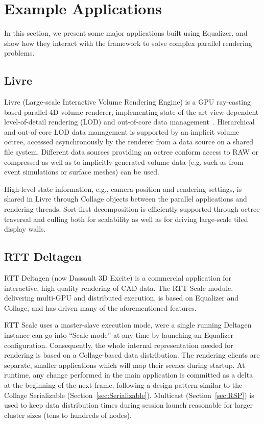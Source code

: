 \documentclass[10pt,journal,compsoc]{IEEEtran}
\newcommand{\sref}[1]{Section~\ref{#1}}
\begin{document}
\section{Example Applications} \label{sApplications}

In this section, we present some major applications built using
\textsf{Equalizer}, and
show how they interact with the framework to solve complex parallel rendering
problems.

\subsection{Livre}

Livre (Large-scale Interactive Volume Rendering Engine) is a GPU ray-casting based parallel
4D volume renderer, implementing state-of-the-art view-dependent level-of-detail rendering (LOD)
and out-of-core data management~\cite{EHKRW:06}. Hierarchical and out-of-core LOD
data management is supported by an implicit volume octree, accessed asynchronously
by the renderer from a data source on a shared file system. Different data sources providing
an octree conform access to RAW or compressed as well as to implicitly generated volume data
(e.g. such as from event simulations or surface meshes) can be used.

High-level state information, e.g., camera position and rendering settings, is shared in Livre
through \textsf{Collage} objects between the parallel applications and rendering threads.
Sort-first decomposition is efficiently supported through octree traversal and culling both
for scalability as well as for driving large-scale tiled display walls.

\subsection{RTT Deltagen}

RTT Deltagen (now Dassault 3D Excite) is a commercial application for
interactive, high quality rendering of CAD data. The RTT Scale module,
delivering multi-GPU and distributed execution, is based on \textsf{Equalizer}
and \textsf{Collage}, and has driven many of the aforementioned features.

RTT Scale uses a master-slave execution mode, were a single running Deltagen
instance can go into ``Scale mode'' at any time by launching an
\textsf{Equalizer} configuration. Consequently, the whole internal
representation needed for rendering is based on a \textsf{Collage}-based data
distribution. The rendering clients are separate, smaller applications which
will map their scenes during startup. At runtime, any change performed in the
main application is committed as a delta at the beginning of the next frame,
following a design pattern similar to the \textsf{Collage Serializable}
(\sref{sec:Serializable}). Multicast (\sref{sec:RSP}) is used to keep data
distribution times during session launch reasonable for larger cluster sizes
(tens to hundreds of nodes).
\end{document}
